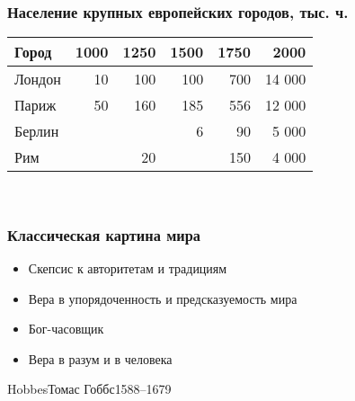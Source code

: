 \documentclass[aspectratio=169]{beamer}
\begin{document}

\begin{bframe}\frametitle{Население крупных европейских городов, тыс. ч.}
\begin{center}
\begin{tabular}{l| r r r r r}
\hline \hline
Город      & 1000         & 1250        & 1500          & 1750             & 2000           \\
\hline \hline
Лондон     & 10           & 100          & 100           & 700              & 14 000         \\
Париж      & 50           & 160          & 185           & 556              & 12 000         \\
Берлин     &              &              & 6             & 90               & 5 000          \\
Рим        &              & 20           &               & 150              & 4 000          \\
\hline \hline 
\end{tabular}\\[10pt]

\end{center}
\end{bframe}






\begin{bframe}\frametitle{Классическая картина мира}

\begin{itemize}
\item<+-> Скепсис к авторитетам и традициям
\item<+-> Вера в упорядоченность и предсказуемость мира
\item<+-> Бог-часовщик
\item<+-> Вера в разум и в человека
\end{itemize} 
\end{bframe}


\begin{Person}{Hobbes}{Томас Гоббс}{1588--1679}

\end{Person}
\end{document}
